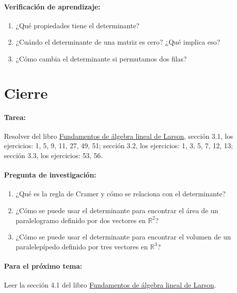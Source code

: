 \documentclass[a4,11pt]{aleph-notas}
\begin{document}
\paragraph{Verificación de aprendizaje:}
\begin{enumerate}[leftmargin=*]
    \item ¿Qué propiedades tiene el determinante?
    \item ¿Cuándo el determinante de una matriz es cero? ¿Qué implica eso?
    \item ¿Cómo cambia el determinante si permutamos dos filas?
\end{enumerate}

\section*{Cierre}

\paragraph{Tarea:}
Resolver del libro \href{https://catalogobiblioteca.puce.edu.ec/cgi-bin/koha/opac-detail.pl?biblionumber=86081}{Fundamentos de álgebra lineal de Larson}, sección 3.1, los ejercicios: 1, 5, 9, 11, 27, 49, 51; sección 3.2, los ejercicios: 1, 3, 5, 7, 12, 13; sección 3.3, los ejercicios: 53, 56.

\paragraph{Pregunta de investigación:}
\begin{enumerate}[leftmargin=*]
    \item ¿Qué es la regla de Cramer y cómo se relaciona con el determinante?
    \item ¿Cómo se puede usar el determinante para encontrar el área de un paralelogramo definido por dos vectores en $\mathbb{R}^2$?
    \item ¿Cómo se puede usar el determinante para encontrar el volumen de un paralelepípedo definido por tres vectores en $\mathbb{R}^3$?
\end{enumerate}

\paragraph{Para el próximo tema:}  
Leer la sección 4.1 del libro \href{https://catalogobiblioteca.puce.edu.ec/cgi-bin/koha/opac-detail.pl?biblionumber=86081}{Fundamentos de álgebra lineal de Larson}.
\end{document}
